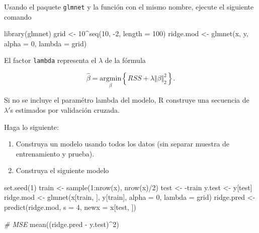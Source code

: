 \documentclass[
  12pt,
]{book}
\newenvironment{Shaded}{\begin{snugshade}}{\end{snugshade}}
\newcommand{\AttributeTok}[1]{\textcolor[rgb]{0.77,0.63,0.00}{#1}}
\newcommand{\CommentTok}[1]{\textcolor[rgb]{0.56,0.35,0.01}{\textit{#1}}}
\newcommand{\DecValTok}[1]{\textcolor[rgb]{0.00,0.00,0.81}{#1}}
\newcommand{\FunctionTok}[1]{\textcolor[rgb]{0.00,0.00,0.00}{#1}}
\newcommand{\NormalTok}[1]{#1}
\newcommand{\OtherTok}[1]{\textcolor[rgb]{0.56,0.35,0.01}{#1}}
\newcommand{\SpecialCharTok}[1]{\textcolor[rgb]{0.00,0.00,0.00}{#1}}
\theoremstyle{definition}
\theoremstyle{definition}
\theoremstyle{definition}
\theoremstyle{remark}
\begin{document}
Usando el paquete \texttt{glmnet} y la función con el mismo nombre, ejecute el siguiente comando

\begin{Shaded}
\begin{Highlighting}[]
\FunctionTok{library}\NormalTok{(glmnet)}
\NormalTok{grid }\OtherTok{\textless{}{-}} \DecValTok{10}\SpecialCharTok{\^{}}\FunctionTok{seq}\NormalTok{(}\DecValTok{10}\NormalTok{, }\SpecialCharTok{{-}}\DecValTok{2}\NormalTok{, }\AttributeTok{length =} \DecValTok{100}\NormalTok{)}
\NormalTok{ridge.mod }\OtherTok{\textless{}{-}} \FunctionTok{glmnet}\NormalTok{(x, y, }\AttributeTok{alpha =} \DecValTok{0}\NormalTok{, }\AttributeTok{lambda =}\NormalTok{ grid)}
\end{Highlighting}
\end{Shaded}

El factor \texttt{lambda} representa el \(\lambda\) de la fórmula

\[ \hat{\beta} = \underset{\beta}{\mathrm{argmin}} \left\{RSS + \lambda \Vert \beta \Vert_2^2\right\}.\]

Si no se incluye el paramétro lambda del modelo, R construye una secuencia de \(\lambda'\)s estimados por validación cruzada.

Haga lo siguiente:

\begin{enumerate}
\def\labelenumi{\arabic{enumi}.}
\item
  Construya un modelo usando todos los datos (sin separar muestra de entrenamiento y prueba).
\item
  Construya el siguiente modelo
\end{enumerate}

\begin{Shaded}
\begin{Highlighting}[]
\FunctionTok{set.seed}\NormalTok{(}\DecValTok{1}\NormalTok{)}
\NormalTok{train }\OtherTok{\textless{}{-}} \FunctionTok{sample}\NormalTok{(}\DecValTok{1}\SpecialCharTok{:}\FunctionTok{nrow}\NormalTok{(x), }\FunctionTok{nrow}\NormalTok{(x)}\SpecialCharTok{/}\DecValTok{2}\NormalTok{)}
\NormalTok{test }\OtherTok{\textless{}{-}} \SpecialCharTok{{-}}\NormalTok{train}
\NormalTok{y.test }\OtherTok{\textless{}{-}}\NormalTok{ y[test]}
\NormalTok{ridge.mod }\OtherTok{\textless{}{-}} \FunctionTok{glmnet}\NormalTok{(x[train, ], y[train], }\AttributeTok{alpha =} \DecValTok{0}\NormalTok{, }
    \AttributeTok{lambda =}\NormalTok{ grid)}
\NormalTok{ridge.pred }\OtherTok{\textless{}{-}} \FunctionTok{predict}\NormalTok{(ridge.mod, }\AttributeTok{s =} \DecValTok{4}\NormalTok{, }\AttributeTok{newx =}\NormalTok{ x[test, }
\NormalTok{    ])}

\CommentTok{\# MSE}
\FunctionTok{mean}\NormalTok{((ridge.pred }\SpecialCharTok{{-}}\NormalTok{ y.test)}\SpecialCharTok{\^{}}\DecValTok{2}\NormalTok{)}
\end{Highlighting}
\end{Shaded}
\end{document}

